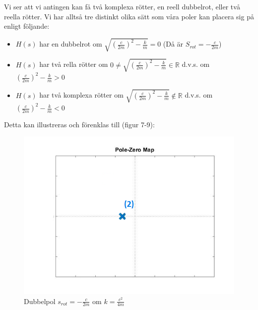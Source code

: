 \documentclass[10pt,a4paper]{article}
\begin{document}
Vi ser att vi antingen kan få två komplexa rötter, en reell dubbelrot, eller två reella rötter. Vi har alltså tre distinkt olika sätt som våra poler kan placera sig på enligt följande:
\begin{itemize}

\item $H(s)$ har en dubbelrot om $\sqrt{(\frac{c}{2m})^2-\frac{k}{m}}=0$ (Då är $S_{rot}=-\frac{c}{2m}$)


\item $H(s)$ har två rella rötter om $0\neq\sqrt{(\frac{c}{2m})^2-\frac{k}{m}}\in \mathbb{R}$ \newline d.v.s. om $(\frac{c}{2m})^2-\frac{k}{m}>0$


\item $H(s)$ har två komplexa rötter om $\sqrt{(\frac{c}{2m})^2-\frac{k}{m}}\notin \mathbb{R}$ \newline d.v.s. om $(\frac{c}{2m})^2-\frac{k}{m}<0$

\end{itemize}

Detta kan illustreras och förenklas till (figur 7-9):

\begin{figure}
\begin{center}
\includegraphics[scale=0.6]{1reell}
\caption{Dubbelpol $s_{rot}=-\frac{c}{2m}$ om $k=\frac{c^2}{4m}$}
\end{center}
\end{figure}
\end{document}
